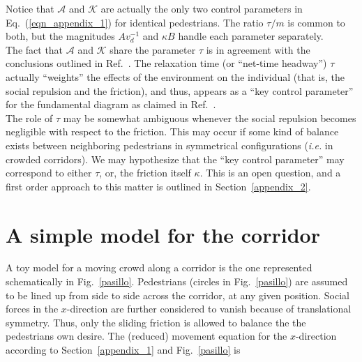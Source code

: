 Notice that $\mathcal{A}$ and $\mathcal{K}$ are actually the only two 
control parameters in Eq.~(\ref{eqn_appendix_1}) for identical 
pedestrians. The ratio $\tau/m$ is common to both, but the magnitudes 
$Av_d^{-1}$ and $\kappa B$ handle each parameter separately.\\

The fact that $\mathcal{A}$ and $\mathcal{K}$ share the parameter $\tau$ is 
in agreement with the conclusions outlined in Ref.~\cite{johansson}. The 
relaxation time (or ``net-time headway'') $\tau$ actually ``weights'' the 
effects of the environment on the individual (that is, the social repulsion and 
the friction), and thus, appears as a ``key control parameter'' for the 
fundamental diagram as claimed in Ref.~\cite{johansson}.\\

The role of $\tau$ may be somewhat ambiguous whenever the social 
repulsion becomes negligible with respect to the friction. This may occur if 
some kind of balance exists between neighboring pedestrians in 
symmetrical configurations (\textit{i.e.} in crowded corridors). We may 
hypothesize that the ``key control parameter'' may correspond to either 
$\tau$, or, the friction itself $\kappa$. This is an open question, and a 
first order approach to this matter is outlined in Section~\ref{appendix_2}.\\


\section{\label{appendix_2}A simple model for the corridor}

A toy model for a moving crowd along a corridor is the one represented 
schematically in Fig.~\ref{pasillo}. Pedestrians (circles in 
Fig.~\ref{pasillo}) 
are assumed to be lined up from side to side across the corridor, at any given 
position. Social forces in the $x$-direction are further considered to vanish 
because of translational symmetry. Thus, only the sliding friction is allowed 
to balance the the pedestrians own desire. The (reduced) movement equation for 
the $x$-direction according to Section~\ref{appendix_1} and Fig.~\ref{pasillo} 
is  

